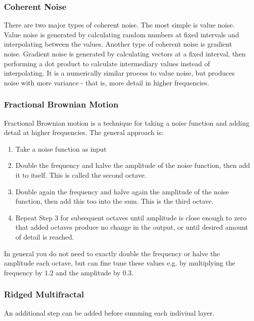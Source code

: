 \subsubsection{Coherent Noise}

There are two major types of coherent noise.
The most simple is value noise.
Value noise is generated by calculating random numbers at fixed intervals and interpolating between the values.
Another type of coherent noise is gradient noise.
Gradient noise is generated by calculating vectors at a fixed interval, then performing a dot product to calculate intermediary values instead of interpolating.
It is a numerically similar process to value noise, but produces noise with more variance - that is, more detail in higher frequencies.

\subsubsection{Fractional Brownian Motion}

Fractional Brownian motion is a technique for taking a noise function and adding detail at higher frequencies.
The general approach is:
\begin{enumerate}
\item Take a noise function as input
\item Double the frequency and halve the amplitude of the noise function, then add it to itself. This is called the second octave.
\item Double again the frequency and halve again the amplitude of the noise function, then add this too into the sum. This is the third octave.
\item Repeat Step 3 for subsequent octaves until amplitude is close enough to zero that added octaves produce no change in the output, or until desired amount of detail is reached.
\end{enumerate}

In general you do not need to exactly double the frequency or halve the amplitude each octave, but can fine tune these values e.g. by multiplying the frequency by 1.2 and the amplitude by 0.3.

\subsubsection{Ridged Multifractal}

An additional step can be added before summing each indiviual layer.
